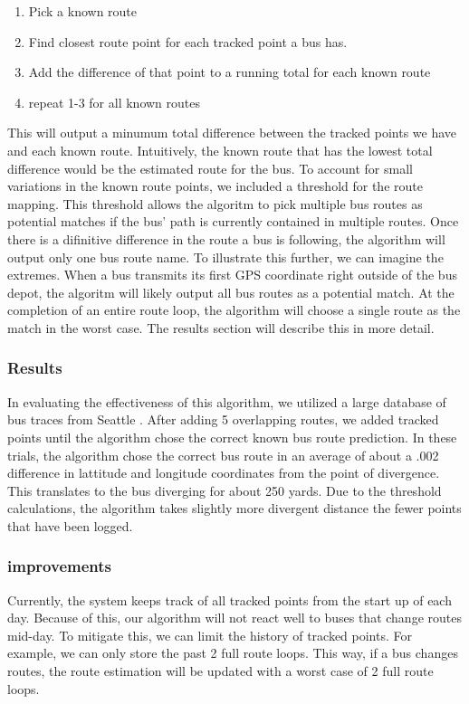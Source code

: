 \documentclass[pageno]{jpaper}
\begin{document}
\begin{enumerate}
    \item Pick a known route
    \item Find closest route point for each tracked point a bus has.
    \item Add the difference of that point to a running total for each known route
    \item repeat 1-3 for all known routes
\end{enumerate}

This will output a minumum total difference between the tracked points we have 
and each known route.  Intuitively, the known route that has the lowest total 
difference would be the estimated route for the bus. To account for small variations 
in the known route points, we included a threshold for the route mapping.  This 
threshold allows the algoritm to pick multiple bus routes as potential matches 
if the bus' path is currently contained in multiple routes. Once there is a 
difinitive difference in the route a bus is following, the algorithm will output 
only one bus route name.  To illustrate this further, we can imagine the extremes. 
When a bus transmits its first GPS coordinate right outside of the bus depot, the 
algoritm will likely output all bus routes as a potential match.  At the completion 
of an entire route loop, the algorithm will choose a single route as the match in 
the worst case.  The results section will describe this in more detail.

\subsubsection{Results}
In evaluating the effectiveness of this algorithm, we utilized a large database of 
bus traces from Seattle \cite{CRAWDAD_Traces}. After adding 5 overlapping routes, we added 
tracked points until the algorithm chose the correct known bus route prediction.  
In these trials, the algorithm chose the correct bus route in an average of about 
a .002 difference in lattitude and longitude coordinates from the point of divergence. 
This translates to the bus diverging for about 250 yards.  Due to the threshold 
calculations, the algorithm takes slightly more divergent distance the fewer points 
that have been logged.  
\subsubsection{improvements}
Currently, the system keeps track of all tracked points from the start up of each day. 
Because of this, our algorithm will not react well to buses that change routes mid-day. 
To mitigate this, we can limit the history of tracked points.  For example, we can only 
store the past 2 full route loops.  This way, if a bus changes routes, the route 
estimation will be updated with a worst case of 2 full route loops.  
\end{document}
